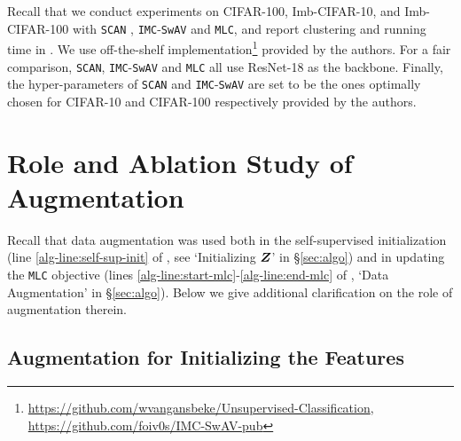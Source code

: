 \documentclass[10pt,twocolumn,letterpaper]{article}
\newcommand{\ours}{MLC}
\newcommand{\mours}{\texttt{\ours}}
\begin{document}
   
   
    Recall that we conduct experiments on CIFAR-100, Imb-CIFAR-10, and Imb-CIFAR-100 with \texttt{SCAN} \cite{Van_Gansbeke2020-eo}, \texttt{IMC}-\texttt{SwAV} \cite{Ntelemis2021-gz} and \mours{}, and report clustering and running time in . We use off-the-shelf implementation\footnote{\scriptsize\url{https://github.com/wvangansbeke/Unsupervised-Classification}, \url{https://github.com/foiv0s/IMC-SwAV-pub}} provided by the authors. For a fair comparison, \texttt{SCAN}, \texttt{IMC}-\texttt{SwAV} and \mours{} all use ResNet-18 as the backbone. Finally, the hyper-parameters of \texttt{SCAN} and \texttt{IMC}-\texttt{SwAV} are set to be the ones optimally chosen for CIFAR-10 and CIFAR-100 respectively provided by the authors.
   
   


   
   


   \section{Role and Ablation Study of Augmentation} \label{sec:appendix-aug}
   Recall that data augmentation was used both in the self-supervised initialization
    (line \ref{alg-line:self-sup-init} of , see `Initializing ${\bm{Z}}$' in \S \ref{sec:algo}) and in updating the \mours{} objective  (lines \ref{alg-line:start-mlc}-\ref{alg-line:end-mlc} of , `Data Augmentation' in \S \ref{sec:algo}). Below we give additional clarification on the role of augmentation therein. 
   
   \subsection{Augmentation for Initializing the Features} \label{sec:aug-for-init}
   
\end{document}
